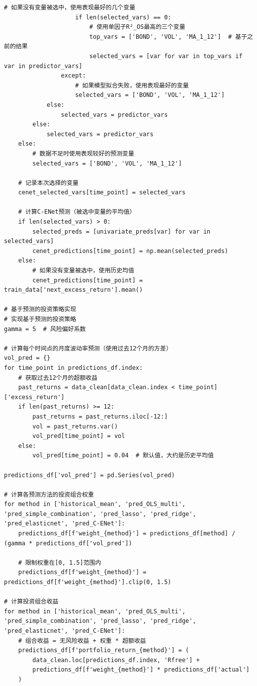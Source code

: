 \documentclass[12pt, a4paper]{article}
\begin{document}
\begin{lstlisting}[basicstyle=\small\ttfamily, breaklines=true, columns=fullflexible]
                    # 如果没有变量被选中，使用表现最好的几个变量
                    if len(selected_vars) == 0:
                        # 使用单因子R²_OS最高的三个变量
                        top_vars = ['BOND', 'VOL', 'MA_1_12']  # 基于之前的结果
                        selected_vars = [var for var in top_vars if var in predictor_vars]
                except:
                    # 如果模型拟合失败，使用表现最好的变量
                    selected_vars = ['BOND', 'VOL', 'MA_1_12']
            else:
                selected_vars = predictor_vars
        else:
            selected_vars = predictor_vars
    else:
        # 数据不足时使用表现较好的预测变量
        selected_vars = ['BOND', 'VOL', 'MA_1_12']
    
    # 记录本次选择的变量
    cenet_selected_vars[time_point] = selected_vars
    
    # 计算C-ENet预测（被选中变量的平均值）
    if len(selected_vars) > 0:
        selected_preds = [univariate_preds[var] for var in selected_vars]
        cenet_predictions[time_point] = np.mean(selected_preds)
    else:
        # 如果没有变量被选中，使用历史均值
        cenet_predictions[time_point] = train_data['next_excess_return'].mean()

# 基于预测的投资策略实现
# 实现基于预测的投资策略
gamma = 5  # 风险偏好系数

# 计算每个时间点的月度波动率预测（使用过去12个月的方差）
vol_pred = {}
for time_point in predictions_df.index:
    # 获取过去12个月的超额收益
    past_returns = data_clean[data_clean.index < time_point]['excess_return']
    if len(past_returns) >= 12:
        past_returns = past_returns.iloc[-12:]
        vol = past_returns.var()
        vol_pred[time_point] = vol
    else:
        vol_pred[time_point] = 0.04  # 默认值，大约是历史平均值

predictions_df['vol_pred'] = pd.Series(vol_pred)

# 计算各预测方法的投资组合权重
for method in ['historical_mean', 'pred_OLS_multi', 'pred_simple_combination', 'pred_lasso', 'pred_ridge', 'pred_elasticnet', 'pred_C-ENet']:
    predictions_df[f'weight_{method}'] = predictions_df[method] / (gamma * predictions_df['vol_pred'])
    
    # 限制权重在[0, 1.5]范围内
    predictions_df[f'weight_{method}'] = predictions_df[f'weight_{method}'].clip(0, 1.5)

# 计算投资组合收益
for method in ['historical_mean', 'pred_OLS_multi', 'pred_simple_combination', 'pred_lasso', 'pred_ridge', 'pred_elasticnet', 'pred_C-ENet']:
    # 组合收益 = 无风险收益 + 权重 * 超额收益
    predictions_df[f'portfolio_return_{method}'] = (
        data_clean.loc[predictions_df.index, 'Rfree'] + 
        predictions_df[f'weight_{method}'] * predictions_df['actual']
    )


\end{lstlisting}
\end{document}
